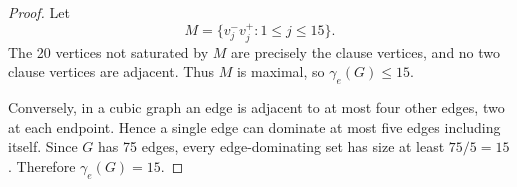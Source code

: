 \documentclass[10pt,a4paper]{amsart}
\begin{document}
\begin{proof}
Let
\[
M=\{v_j^-v_j^+:1\leq j\leq15\}.
\]
The 20 vertices not saturated by \(M\) are precisely the clause vertices, and no two clause vertices are adjacent.  Thus \(M\) is maximal, so \(\gamma_e(G)\leq15\).

Conversely, in a cubic graph an edge is adjacent to at most four other edges, two at each endpoint.  Hence a single edge can dominate at most five edges including itself.  Since \(G\) has 75 edges, every edge-dominating set has size at least \(75/5=15\).  Therefore \(\gamma_e(G)=15\).
\end{proof}
\end{document}

